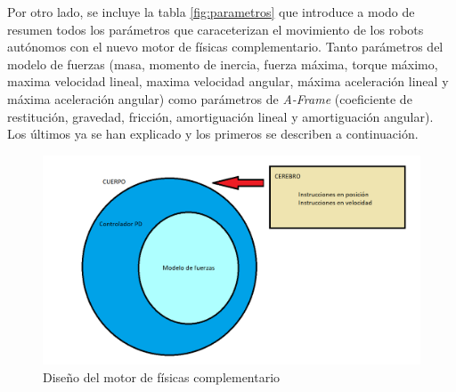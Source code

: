 Por otro lado, se incluye la tabla \ref{fig:parametros} que introduce a modo de resumen todos los parámetros que caraceterizan el movimiento
de los robots autónomos con el nuevo motor de físicas complementario. Tanto parámetros del modelo de fuerzas (masa, momento de inercia, fuerza máxima, torque máximo, maxima velocidad lineal, maxima velocidad angular, máxima aceleración lineal y máxima aceleración angular) como parámetros de \textit{A-Frame} (coeficiente de restitución, gravedad, fricción, amortiguación lineal y amortiguación angular). Los últimos ya se han explicado y los primeros se describen a continuación.

\begin{figure}[h!]
    \centering
    \includegraphics[scale=0.8]{Diseño_motor_4.PNG}
    \caption[Diseño del motor de físicas complementario]{Diseño del motor de físicas complementario\footnotemark}
    \label{fig:motor_diseño}
\end{figure}

